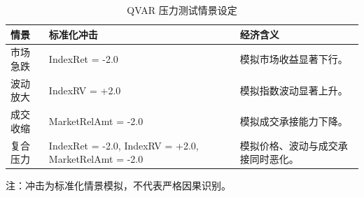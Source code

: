 \begin{table}[H]
\centering
\caption{QVAR 压力测试情景设定}
\label{tab:qvar-scenarios}
\small
\begin{threeparttable}
\begin{tabularx}{\textwidth}{p{}p{}Y}
\toprule
情景 & 标准化冲击 & 经济含义 \\
\midrule
市场急跌 & IndexRet = -2.0 & 模拟市场收益显著下行。 \\
波动放大 & IndexRV = +2.0 & 模拟指数波动显著上升。 \\
成交收缩 & MarketRelAmt = -2.0 & 模拟成交承接能力下降。 \\
复合压力 & IndexRet = -2.0, IndexRV = +2.0, MarketRelAmt = -2.0 & 模拟价格、波动与成交承接同时恶化。 \\
\bottomrule
\end{tabularx}
\begin{tablenotes}[flushleft]
\footnotesize
\item 注：冲击为标准化情景模拟，不代表严格因果识别。
\end{tablenotes}
\end{threeparttable}
\end{table}
